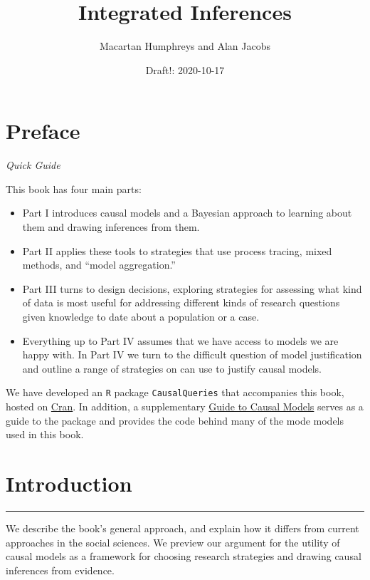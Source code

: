 \documentclass[
  12pt,
]{book}
\title{Integrated Inferences}
\author{Macartan Humphreys and Alan Jacobs}
\date{Draft!: 2020-10-17}
\begin{document}
\maketitle

{
\setcounter{tocdepth}{1}
\tableofcontents
}
\hypertarget{preface}{%
\chapter*{Preface}\label{preface}}

\emph{Quick Guide}

This book has four main parts:

\begin{itemize}
\item
  Part I introduces causal models and a Bayesian approach to learning about them and drawing inferences from them.
\item
  Part II applies these tools to strategies that use process tracing, mixed methods, and ``model aggregation.''
\item
  Part III turns to design decisions, exploring strategies for assessing what kind of data is most useful for addressing different kinds of research questions given knowledge to date about a population or a case.
\item
  Everything up to Part IV assumes that we have access to models we are happy with. In Part IV we turn to the difficult question of model justification and outline a range of strategies on can use to justify causal models.
\end{itemize}

We have developed an \texttt{R} package \texttt{CausalQueries} that accompanies this book, hosted on \href{https://cran.r-project.org/web/packages/CausalQueries/index.html}{Cran}. In addition, a supplementary \href{https://macartan.github.io/causalmodels/}{Guide to Causal Models} serves as a guide to the package and provides the code behind many of the mode models used in this book.

\hypertarget{intro}{%
\chapter{Introduction}\label{intro}}

\begin{center}\rule{0.5\linewidth}{0.5pt}\end{center}

We describe the book's general approach, and explain how it differs from current approaches in the social sciences. We preview our argument for the utility of causal models as a framework for choosing research strategies and drawing causal inferences from evidence.
\end{document}
